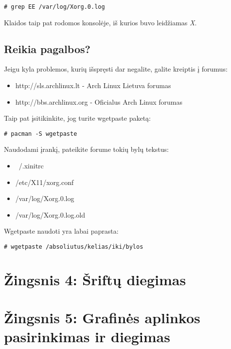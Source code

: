       \begin{verbatim}
# grep EE /var/log/Xorg.0.log
      \end{verbatim}

      Klaidos taip pat rodomos konsolėje, iš kurios buvo leidžiamas \textsl{X}.

    \subsection{Reikia pagalbos?}

      Jeigu kyla problemos, kurių išspręsti dar negalite, galite
      kreiptis į forumus:

      \begin{itemize}
        \item http://sls.archlinux.lt - Arch Linux Lietuva forumas
        \item http://bbs.archlinux.org - Oficialus Arch Linux forumas
      \end{itemize}

      Taip pat įsitikinkite, jog turite wgetpaste paketą:

      \begin{verbatim}
# pacman -S wgetpaste
      \end{verbatim}

      Naudodami įrankį, pateikite forume tokių bylų tekstus:

      \begin{itemize}
        \item ~/.xinitrc
        \item /etc/X11/xorg.conf
        \item /var/log/Xorg.0.log
        \item /var/log/Xorg.0.log.old
      \end{itemize}

      Wgetpaste naudoti yra labai paprasta:

      \begin{verbatim}
# wgetpaste /absoliutus/kelias/iki/bylos        
      \end{verbatim}

  \section{Žingsnis 4: Šriftų diegimas}

  \section{Žingsnis 5: Grafinės aplinkos pasirinkimas ir diegimas}

